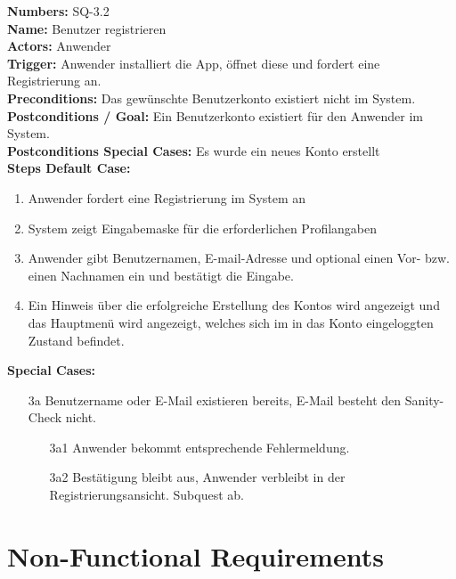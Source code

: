 \documentclass{article}
\begin{document}
\begin{samepage}
\textbf{Numbers:} SQ-3.2\\
\textbf{Name:} Benutzer registrieren\\
\textbf{Actors:} Anwender\\
\textbf{Trigger:} Anwender installiert die App, öffnet diese und fordert eine Registrierung an.\\
\textbf{Preconditions:} Das gewünschte Benutzerkonto existiert nicht im System. \\
\textbf{Postconditions / Goal:} Ein Benutzerkonto existiert für den Anwender im System.\\
\textbf{Postconditions Special Cases:} Es wurde ein neues Konto erstellt\\
\textbf{Steps Default Case:}
\begin{enumerate}
    \item Anwender fordert eine Registrierung im System an
    \item System zeigt Eingabemaske für die erforderlichen Profilangaben
    \item Anwender gibt Benutzernamen, E-mail-Adresse und optional einen Vor- bzw. einen Nachnamen ein und bestätigt die Eingabe.
    \item Ein Hinweis über die erfolgreiche Erstellung des Kontos wird angezeigt und das Hauptmenü wird angezeigt, welches sich im in das Konto eingeloggten Zustand befindet.
\end{enumerate}
\textbf{Special Cases:}
\begin{itemize}
\item [3a] Benutzername oder E-Mail existieren bereits, E-Mail besteht den Sanity-Check nicht.
\begin{itemize}
    \item [3a1] Anwender bekommt entsprechende Fehlermeldung.
    \item [3a2] Bestätigung bleibt aus, Anwender verbleibt in der Registrierungsansicht.
    Subquest ab.
\end{itemize}
\end{itemize}
\end{samepage}

\section{Non-Functional Requirements}
\end{document}
